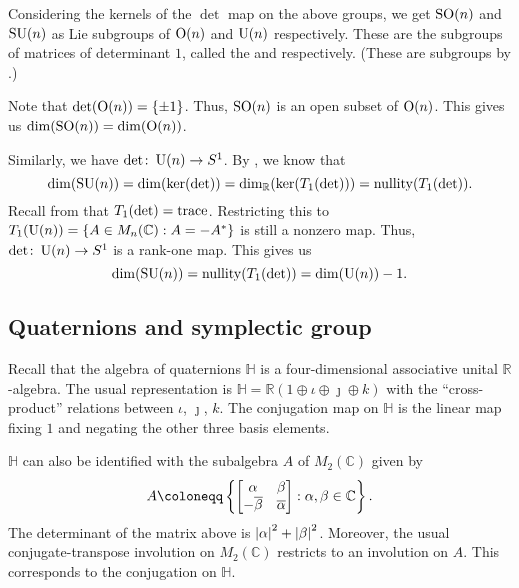 \documentclass[12pt]{article}
\begin{document}
\begin{ex} \label{ex:special-orthogonal-unitary-groups-dimensions}
	Considering the kernels of the $\det$ map on the above groups, 
	we get $\operatorname{SO}(n)$ and $\operatorname{SU}(n)$ as Lie subgroups of $\operatorname{O}(n)$ 
	and $\operatorname{U}(n)$ respectively. 
	These are the subgroups of matrices of determinant $1$, called the  
	and  respectively. 
	(These are subgroups by .)

	Note that $\det(\operatorname{O}(n)) = \{\pm 1\}$. Thus, $\operatorname{SO}(n)$ is an open subset of $\operatorname{O}(n)$. 
	This gives us $\dim(\operatorname{SO}(n)) = \dim(\operatorname{O}(n))$.

	Similarly, we have $\det \colon \operatorname{U}(n) \to S^{1}$. 
	By , we know that
	\begin{equation*} 
		\dim(\operatorname{SU}(n)) = \dim(\ker(\det)) = \dim_{\mathbb{R}}(\ker(T_{1}(\det))) = \operatorname{nullity}(T_{1}(\det)).
	\end{equation*}
	Recall from  that $T_{1}(\det) = \operatorname{trace}$. 
	Restricting this to $T_{1}(\operatorname{U}(n)) = \{A \in M_{n}(\mathbb{C}) : A = -A^{\ast}\}$ is still a nonzero map. 
	Thus, $\det \colon \operatorname{U}(n) \to S^{1}$ is a rank-one map. This gives us
	\begin{equation*} 
		\dim(\operatorname{SU}(n)) = \operatorname{nullity}(T_{1}(\det)) = \dim(\operatorname{U}(n)) - 1.
	\end{equation*}
\end{ex}

\subsection{Quaternions and symplectic group} \label{subsec:sympletic-group}

Recall that the algebra of quaternions $\mathbb{H}$ is a four-dimensional associative unital $\mathbb{R}$-algebra. 
The usual representation is $\mathbb{H} = \mathbb{R}(1 \oplus \iota \oplus \jmath \oplus k)$ with the ``cross-product'' relations between $\iota$, $\jmath$, $k$. 
The conjugation map on $\mathbb{H}$ is the linear map fixing $1$ and negating the other three basis elements.

$\mathbb{H}$ can also be identified with the subalgebra $A$ of $M_{2}(\mathbb{C})$ given by
\begin{equation*} 
	A \coloneqq 
	\left\{\two{\alpha}{\beta}{-\overline{\beta}}{\overline{\alpha}} : \alpha, \beta \in \mathbb{C}\right\}.
\end{equation*}
The determinant of the matrix above is ${\left\lvert \alpha \right\lvert}^{2} + {\left\lvert \beta \right\lvert}^{2}$. 
Moreover, the usual conjugate-transpose involution on $M_{2}(\mathbb{C})$ restricts to an involution on $A$. 
This corresponds to the conjugation on $\mathbb{H}$.
\end{document}
